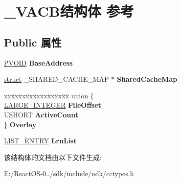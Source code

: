 \hypertarget{struct___v_a_c_b}{}\section{\+\_\+\+V\+A\+C\+B结构体 参考}
\label{struct___v_a_c_b}
\subsection*{Public 属性}
\begin{DoxyCompactItemize}
\item 
\mbox{\label{struct___v_a_c_b_a66031c8ec280068cda947a8b62c683c8}} 
\hyperlink{interfacevoid}{P\+V\+O\+ID} {\bfseries Base\+Address}
\item 
\mbox{\label{struct___v_a_c_b_ac30341c6615355d4fc83a75fb1aad77d}} 
\hyperlink{interfacestruct}{struct} \+\_\+\+S\+H\+A\+R\+E\+D\+\_\+\+C\+A\+C\+H\+E\+\_\+\+M\+AP $\ast$ {\bfseries Shared\+Cache\+Map}
\item 
\mbox{\label{struct___v_a_c_b_aa7e2726bd843f5e9eceac21b6b3cb84c}} 
\begin{tabbing}
xx\=xx\=xx\=xx\=xx\=xx\=xx\=xx\=xx\=\kill
union \{\\
\>\hyperlink{union___l_a_r_g_e___i_n_t_e_g_e_r}{LARGE\_INTEGER} {\bfseries FileOffset}\\
\>USHORT {\bfseries ActiveCount}\\
\} {\bfseries Overlay}\\

\end{tabbing}\item 
\mbox{\label{struct___v_a_c_b_abd6c4e05383dd04f6444b412d9267e92}} 
\hyperlink{struct___l_i_s_t___e_n_t_r_y}{L\+I\+S\+T\+\_\+\+E\+N\+T\+RY} {\bfseries Lru\+List}
\end{DoxyCompactItemize}


该结构体的文档由以下文件生成\+:\begin{DoxyCompactItemize}
\item 
E\+:/\+React\+O\+S-\/0../sdk/include/ndk/cctypes.\+h\end{DoxyCompactItemize}
